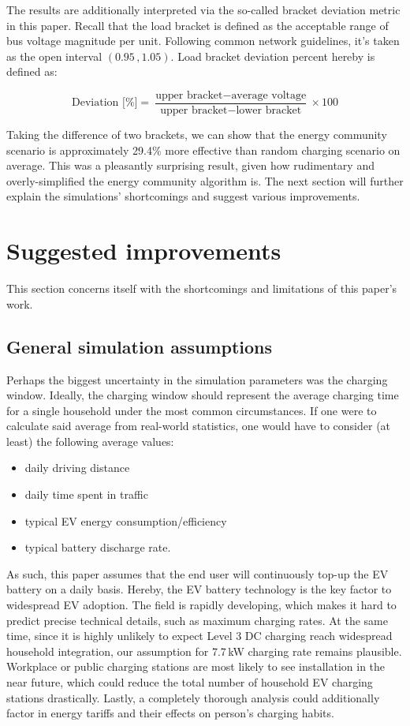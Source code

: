 \documentclass[a4paper,10pt]{report}
\begin{document}
The results are additionally interpreted via the so-called bracket deviation metric in this paper. Recall that the load bracket is defined as the acceptable range of bus voltage magnitude per unit. Following common network guidelines, it's taken as the open interval $(0.95\,, 1.05)$. Load bracket deviation percent hereby is defined as:

\begin{equation}
	\text{Deviation [\%]} = \frac{\text{upper bracket} - \text{average voltage}}{\text{upper bracket}-\text{lower bracket}}\times 100
\end{equation}

Taking the difference of two brackets, we can show that the energy community scenario is approximately 29.4\% more effective than random charging scenario on average. This was a pleasantly surprising result, given how rudimentary and overly-simplified the energy community algorithm is. The next section will further explain the simulations' shortcomings and suggest various improvements.

\vfill
\section{Suggested improvements}\label{section_improvements}
This section concerns itself with the shortcomings and limitations of this paper's work.

\subsection{General simulation assumptions}
Perhaps the biggest uncertainty in the simulation parameters was the charging window. Ideally, the charging window should represent the average charging time for a single household under the most common circumstances. If one were to calculate said average from real-world statistics, one would have to consider (at least) the following average values:
\begin{itemize}
	\item daily driving distance
	\item daily time spent in traffic
	\item typical EV energy consumption/efficiency
	\item typical battery discharge rate\quad .
\end{itemize}

As such, this paper assumes that the end user will continuously top-up the EV battery on a daily basis. Hereby, the EV battery technology is the key factor to widespread EV adoption. The field is rapidly developing, which makes it hard to predict precise technical details, such as maximum charging rates. At the same time, since it is highly unlikely to expect Level 3 DC charging reach widespread household integration, our assumption for 7.7\,kW charging rate remains plausible. Workplace or public charging stations are most likely to see installation in the near future, which could reduce the total number of household EV charging stations drastically. Lastly, a completely thorough analysis could additionally factor in energy tariffs and their effects on person's charging habits.
\end{document}
